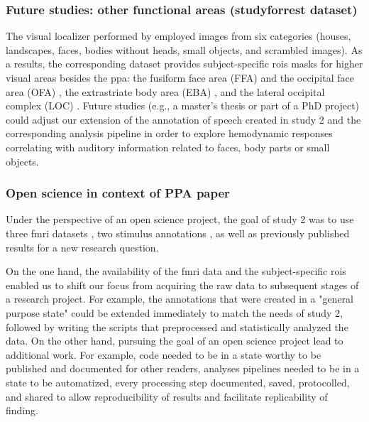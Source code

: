 

\subsubsection{Future studies: other functional areas (studyforrest dataset)}


The visual localizer performed by \citet{sengupta2016extension} employed images
from six categories (houses, landscapes, faces, bodies without heads, small
objects, and scrambled images).
%
As a results, the corresponding dataset provides subject-specific \acp{roi}
masks for higher visual areas besides the \ac{ppa}:
%
the fusiform face area (FFA) \citep{kanwisher1997ffa} and the occipital face
area (OFA) \citep{pitcher2011occipitalfacearea},
%
the extrastriate body area (EBA) \citep{downing2001bodyarea},
%
and the lateral occipital complex (LOC) \citep{malach1995loc}.
%
Future studies (e.g., a master's thesis or part of a PhD project) could adjust
our extension of the annotation of speech created in study 2 and the
corresponding analysis pipeline in order to explore hemodynamic responses
correlating with auditory information related to faces, body parts or small
objects.


\subsubsection{Open science in context of PPA paper}

Under the perspective of an open science project, the goal of study 2 was to use
three \ac{fmri} datasets \citep{hanke2014audiomovie, hanke2016simultaneous,
sengupta2016extension}, two stimulus annotations \citep{haeusler2021speechanno,
haeusler2016cutanno}, as well as previously published results
\citep{sengupta2016extension} for a new research question.


On the one hand, the availability of the \ac{fmri} data and the subject-specific
\acp{roi} enabled us to shift our focus from acquiring the raw data to
subsequent stages of a research project.
For example, the annotations that were created in a "general purpose state"
could be extended immediately to match the needs of study 2, followed by writing
the scripts that preprocessed and statistically analyzed the data.
On the other hand, pursuing the goal of an open science project lead to
additional work.
For example, code needed to be in a state worthy to be published and documented
for other readers, analyses pipelines needed to be in a state to be automatized,
every processing step documented, saved, protocolled, and shared to allow
reproducibility of results and facilitate replicability of finding.

